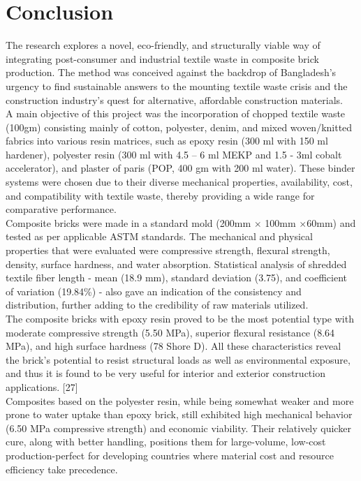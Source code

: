 \chapter{Conclusion}
The research explores a novel, eco-friendly, and structurally viable way of integrating post-consumer and industrial textile waste in composite brick production. The method was conceived against the backdrop of Bangladesh's urgency to find sustainable answers to the mounting textile waste crisis and the construction industry's quest for alternative, affordable construction materials.\\

\noindent A main objective of this project was the incorporation of chopped textile waste (100gm) consisting mainly of cotton, polyester, denim, and mixed woven/knitted fabrics into various resin matrices, such as epoxy resin (300 ml with 150 ml hardener), polyester resin (300 ml with 4.5 – 6 ml MEKP and 1.5 - 3ml cobalt accelerator), and plaster of paris (POP, 400 gm with 200 ml water). These binder systems were chosen due to their diverse mechanical properties, availability, cost, and compatibility with textile waste, thereby providing a wide range for comparative performance. \\

\noindent Composite bricks were made in a standard mold (200mm $\times$ 100mm $\times$60mm) and tested as per applicable ASTM standards. The mechanical and physical properties that were evaluated were compressive strength, flexural strength, density, surface hardness, and water absorption. Statistical analysis of shredded textile fiber length - mean (18.9 mm), standard deviation (3.75), and coefficient of variation (19.84\%) - also gave an indication of the consistency and distribution, further adding to the credibility of raw materials utilized.\\

\noindent The composite bricks with epoxy resin proved to be the most potential type with moderate compressive strength (5.50 MPa), superior flexural resistance (8.64 MPa), and high surface hardness (78 Shore D). All these characteristics reveal the brick's potential to resist structural loads as well as environmental exposure, and thus it is found to be very useful for interior and exterior construction applications. [27] \\

\noindent Composites based on the polyester resin, while being somewhat weaker and more prone to water uptake than epoxy brick, still exhibited high mechanical behavior (6.50 MPa compressive strength) and economic viability. Their relatively quicker cure, along with better handling, positions them for large-volume, low-cost production-perfect for developing countries where material cost and resource efficiency take precedence. \\

